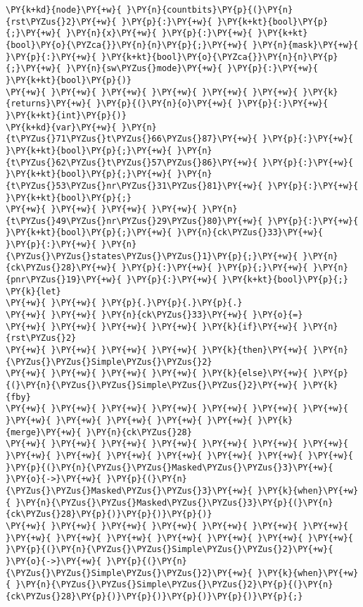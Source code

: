 \begin{Verbatim}[commandchars=\\\{\}]
\PY{k+kd}{node}\PY{+w}{ }\PY{n}{countbits}\PY{p}{(}\PY{n}{rst\PYZus{}2}\PY{+w}{ }\PY{p}{:}\PY{+w}{ }\PY{k+kt}{bool}\PY{p}{;}\PY{+w}{ }\PY{n}{x}\PY{+w}{ }\PY{p}{:}\PY{+w}{ }\PY{k+kt}{bool}\PY{o}{\PYZca{}}\PY{n}{n}\PY{p}{;}\PY{+w}{ }\PY{n}{mask}\PY{+w}{ }\PY{p}{:}\PY{+w}{ }\PY{k+kt}{bool}\PY{o}{\PYZca{}}\PY{n}{n}\PY{p}{;}\PY{+w}{ }\PY{n}{sw\PYZus{}mode}\PY{+w}{ }\PY{p}{:}\PY{+w}{ }\PY{k+kt}{bool}\PY{p}{)}
\PY{+w}{ }\PY{+w}{ }\PY{+w}{ }\PY{+w}{ }\PY{+w}{ }\PY{+w}{ }\PY{k}{returns}\PY{+w}{ }\PY{p}{(}\PY{n}{o}\PY{+w}{ }\PY{p}{:}\PY{+w}{ }\PY{k+kt}{int}\PY{p}{)}
\PY{k+kd}{var}\PY{+w}{ }\PY{n}{t\PYZus{}71\PYZus{}t\PYZus{}66\PYZus{}87}\PY{+w}{ }\PY{p}{:}\PY{+w}{ }\PY{k+kt}{bool}\PY{p}{;}\PY{+w}{ }\PY{n}{t\PYZus{}62\PYZus{}t\PYZus{}57\PYZus{}86}\PY{+w}{ }\PY{p}{:}\PY{+w}{ }\PY{k+kt}{bool}\PY{p}{;}\PY{+w}{ }\PY{n}{t\PYZus{}53\PYZus{}nr\PYZus{}31\PYZus{}81}\PY{+w}{ }\PY{p}{:}\PY{+w}{ }\PY{k+kt}{bool}\PY{p}{;}
\PY{+w}{ }\PY{+w}{ }\PY{+w}{ }\PY{+w}{ }\PY{n}{t\PYZus{}49\PYZus{}nr\PYZus{}29\PYZus{}80}\PY{+w}{ }\PY{p}{:}\PY{+w}{ }\PY{k+kt}{bool}\PY{p}{;}\PY{+w}{ }\PY{n}{ck\PYZus{}33}\PY{+w}{ }\PY{p}{:}\PY{+w}{ }\PY{n}{\PYZus{}\PYZus{}states\PYZus{}\PYZus{}1}\PY{p}{;}\PY{+w}{ }\PY{n}{ck\PYZus{}28}\PY{+w}{ }\PY{p}{:}\PY{+w}{ }\PY{p}{;}\PY{+w}{ }\PY{n}{pnr\PYZus{}19}\PY{+w}{ }\PY{p}{:}\PY{+w}{ }\PY{k+kt}{bool}\PY{p}{;}
\PY{k}{let}
\PY{+w}{ }\PY{+w}{ }\PY{p}{.}\PY{p}{.}\PY{p}{.}
\PY{+w}{ }\PY{+w}{ }\PY{n}{ck\PYZus{}33}\PY{+w}{ }\PY{o}{=}
\PY{+w}{ }\PY{+w}{ }\PY{+w}{ }\PY{+w}{ }\PY{k}{if}\PY{+w}{ }\PY{n}{rst\PYZus{}2}
\PY{+w}{ }\PY{+w}{ }\PY{+w}{ }\PY{+w}{ }\PY{k}{then}\PY{+w}{ }\PY{n}{\PYZus{}\PYZus{}Simple\PYZus{}\PYZus{}2}
\PY{+w}{ }\PY{+w}{ }\PY{+w}{ }\PY{+w}{ }\PY{k}{else}\PY{+w}{ }\PY{p}{(}\PY{n}{\PYZus{}\PYZus{}Simple\PYZus{}\PYZus{}2}\PY{+w}{ }\PY{k}{fby}
\PY{+w}{ }\PY{+w}{ }\PY{+w}{ }\PY{+w}{ }\PY{+w}{ }\PY{+w}{ }\PY{+w}{ }\PY{+w}{ }\PY{+w}{ }\PY{+w}{ }\PY{+w}{ }\PY{+w}{ }\PY{k}{merge}\PY{+w}{ }\PY{n}{ck\PYZus{}28}
\PY{+w}{ }\PY{+w}{ }\PY{+w}{ }\PY{+w}{ }\PY{+w}{ }\PY{+w}{ }\PY{+w}{ }\PY{+w}{ }\PY{+w}{ }\PY{+w}{ }\PY{+w}{ }\PY{+w}{ }\PY{+w}{ }\PY{+w}{ }\PY{p}{(}\PY{n}{\PYZus{}\PYZus{}Masked\PYZus{}\PYZus{}3}\PY{+w}{ }\PY{o}{->}\PY{+w}{ }\PY{p}{(}\PY{n}{\PYZus{}\PYZus{}Masked\PYZus{}\PYZus{}3}\PY{+w}{ }\PY{k}{when}\PY{+w}{ }\PY{n}{\PYZus{}\PYZus{}Masked\PYZus{}\PYZus{}3}\PY{p}{(}\PY{n}{ck\PYZus{}28}\PY{p}{)}\PY{p}{)}\PY{p}{)}
\PY{+w}{ }\PY{+w}{ }\PY{+w}{ }\PY{+w}{ }\PY{+w}{ }\PY{+w}{ }\PY{+w}{ }\PY{+w}{ }\PY{+w}{ }\PY{+w}{ }\PY{+w}{ }\PY{+w}{ }\PY{+w}{ }\PY{+w}{ }\PY{p}{(}\PY{n}{\PYZus{}\PYZus{}Simple\PYZus{}\PYZus{}2}\PY{+w}{ }\PY{o}{->}\PY{+w}{ }\PY{p}{(}\PY{n}{\PYZus{}\PYZus{}Simple\PYZus{}\PYZus{}2}\PY{+w}{ }\PY{k}{when}\PY{+w}{ }\PY{n}{\PYZus{}\PYZus{}Simple\PYZus{}\PYZus{}2}\PY{p}{(}\PY{n}{ck\PYZus{}28}\PY{p}{)}\PY{p}{)}\PY{p}{)}\PY{p}{)}\PY{p}{;}

\end{Verbatim}
